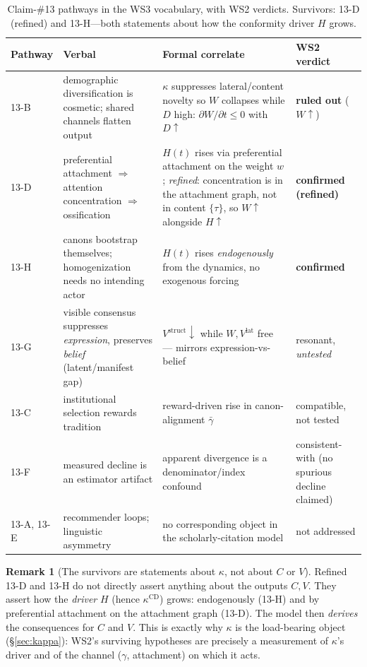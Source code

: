 \documentclass[11pt,letterpaper]{article}
\theoremstyle{definition}
\newtheorem{remark}{Remark}[section]
\theoremstyle{plain}
\begin{document}
\begin{table}[h]
\centering
\small
\begin{tabular}{@{}p{1.9cm}p{3.8cm}p{6.0cm}p{2.4cm}@{}}
\toprule
Pathway & Verbal & Formal correlate & WS2 verdict \\
\midrule
13-B & demographic diversification is cosmetic; shared channels flatten output &
$\kappa$ suppresses lateral/content novelty so $W$ collapses while $D$ high:
$\partial W/\partial t\le 0$ with $D\uparrow$ & \textbf{ruled out} ($W\uparrow$) \\[2pt]
13-D & preferential attachment $\Rightarrow$ attention concentration $\Rightarrow$
ossification & $H(t)$ rises via preferential attachment on the weight $w$;
\emph{refined}: concentration is in the attachment graph, not in content
$\{\tau\}$, so $W\uparrow$ alongside $H\uparrow$ & \textbf{confirmed (refined)} \\[2pt]
13-H & canons bootstrap themselves; homogenization needs no intending actor &
$H(t)$ rises \emph{endogenously} from the dynamics, no exogenous forcing &
\textbf{confirmed} \\[2pt]
13-G & visible consensus suppresses \emph{expression}, preserves \emph{belief}
(latent/manifest gap) & $V^{\mathrm{struct}}\!\downarrow$ while
$W,V^{\mathrm{lat}}$ free --- mirrors expression-vs-belief &
resonant, \emph{untested} \\[2pt]
13-C & institutional selection rewards tradition & reward-driven rise in
canon-alignment $\bar\gamma$ & compatible, not tested \\[2pt]
13-F & measured decline is an estimator artifact & apparent divergence is a
denominator/index confound & consistent-with (no spurious decline claimed) \\[2pt]
13-A, 13-E & recommender loops; linguistic asymmetry & no corresponding object in
the scholarly-citation model & not addressed \\
\bottomrule
\end{tabular}
\caption{Claim-\#13 pathways in the WS3 vocabulary, with WS2 verdicts. Survivors:
13-D (refined) and 13-H---both statements about how the conformity driver $H$
grows.}
\label{tab:pathways}
\end{table}

\begin{remark}[The survivors are statements about $\kappa$, not about $C$ or $V$]
Refined 13-D and 13-H do not directly assert anything about the outputs $C,V$.
They assert how the \emph{driver} $H$ (hence $\kappa^{\mathrm{CD}}$) grows:
endogenously (13-H) and by preferential attachment on the attachment graph
(13-D). The model then \emph{derives} the consequences for $C$ and $V$. This is
exactly why $\kappa$ is the load-bearing object (\S\ref{sec:kappa}): WS2's
surviving hypotheses are precisely a measurement of $\kappa$'s driver and of the
channel ($\gamma$, attachment) on which it acts.
\end{remark}
\end{document}
